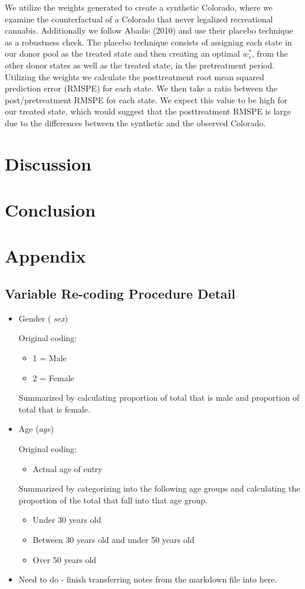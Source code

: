 \documentclass{article}
\begin{document}
We utilize the weights generated to create a synthetic Colorado, where we examine the counterfactual of a Colorado that never legalized recreational cannabis. Additionally we follow Abadie (2010) and use their placebo technique as a robustness check. The placebo technique consists of assigning each state in our donor pool as the treated state and then creating an optimal $w^{*}_s$, from the other donor states as well as the treated state, in the pretreatment period. Utilizing the weights we calculate the posttreatment root mean squared prediction error (RMSPE) for each state. We then take a ratio between the post/pretreatment RMSPE for each state. We expect this value to be high for our treated state, which would suggest that the posttreatment RMSPE is large due to the differences between the synthetic and the observed Colorado.

\section{Discussion}

\section{Conclusion}

\section{Appendix}

\subsection{Variable Re-coding Procedure Detail}

\begin{itemize}
\item
Gender ( \emph{sex})

Original coding:
\begin{itemize}
\item
1 = Male
\item
2 = Female
\end{itemize}
Summarized by calculating proportion of total that is male and proportion of total that is female.

\item
Age (\emph{age})

Original coding:
\begin{itemize}
\item
Actual age of entry
\end{itemize}
Summarized by categorizing into the following age groups and calculating the proportion of the total that fall into that age group.
\begin{itemize}
\item
Under 30 years old
\item
Between 30 years old and under 50 years old
\item
Over 50 years old
\end{itemize}

\item
Need to do - finish transferring notes from the markdown file into here.

\end{itemize}
\end{document}
